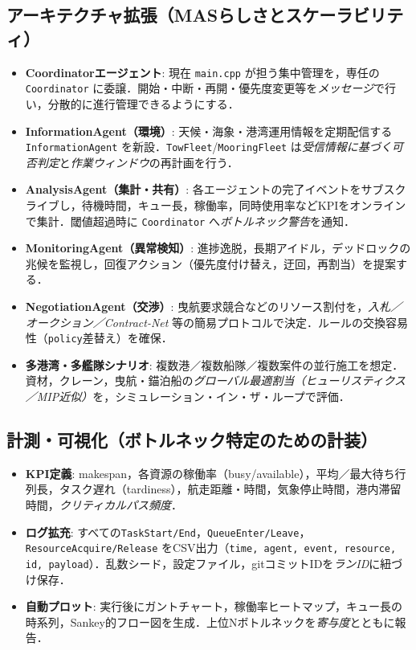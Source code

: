 \documentclass[10pt,letterpaper]{jsarticle}
\begin{document}
\subsection{アーキテクチャ拡張（MASらしさとスケーラビリティ）}
\begin{itemize}
\item \textbf{Coordinatorエージェント}: 現在 \texttt{main.cpp} が担う集中管理を，専任の \texttt{Coordinator} に委譲．開始・中断・再開・優先度変更等を\emph{メッセージ}で行い，分散的に進行管理できるようにする．
\item \textbf{InformationAgent（環境）}: 天候・海象・港湾運用情報を定期配信する \texttt{InformationAgent} を新設．\texttt{TowFleet}/\texttt{MooringFleet} は\emph{受信情報に基づく可否判定}と\emph{作業ウィンドウ}の再計画を行う．
\item \textbf{AnalysisAgent（集計・共有）}: 各エージェントの完了イベントをサブスクライブし，待機時間，キュー長，稼働率，同時使用率などKPIをオンラインで集計．閾値超過時に \texttt{Coordinator} へ\emph{ボトルネック警告}を通知．
\item \textbf{MonitoringAgent（異常検知）}: 進捗逸脱，長期アイドル，デッドロックの兆候を監視し，回復アクション（優先度付け替え，迂回，再割当）を提案する．
\item \textbf{NegotiationAgent（交渉）}: 曳航要求競合などのリソース割付を，\emph{入札／オークション／Contract-Net} 等の簡易プロトコルで決定．ルールの交換容易性（\texttt{policy}差替え）を確保．
\item \textbf{多港湾・多艦隊シナリオ}: 複数港／複数船隊／複数案件の並行施工を想定．資材，クレーン，曳航・錨泊船の\emph{グローバル最適割当（ヒューリスティクス／MIP近似）}を，シミュレーション・イン・ザ・ループで評価．
\end{itemize}

\subsection{計測・可視化（ボトルネック特定のための計装）}
\begin{itemize}
\item \textbf{KPI定義}: makespan，各資源の稼働率（busy/available），平均／最大待ち行列長，タスク遅れ（tardiness），航走距離・時間，気象停止時間，港内滞留時間，\emph{クリティカルパス頻度}．
\item \textbf{ログ拡充}: すべての\texttt{TaskStart/End}，\texttt{QueueEnter/Leave}，\texttt{ResourceAcquire/Release} をCSV出力（\texttt{time, agent, event, resource, id, payload}）．乱数シード，設定ファイル，gitコミットIDを\emph{ランID}に紐づけ保存．
\item \textbf{自動プロット}: 実行後にガントチャート，稼働率ヒートマップ，キュー長の時系列，Sankey的フロー図を生成．上位Nボトルネックを\emph{寄与度}とともに報告．
\end{itemize}
\end{document}
